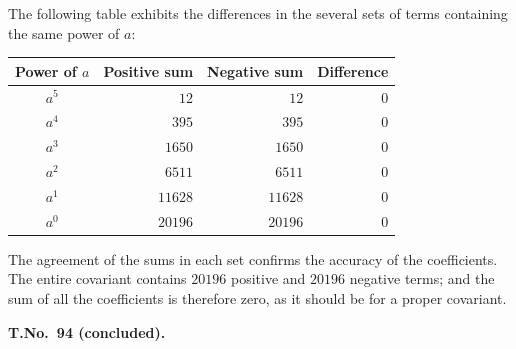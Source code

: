 \documentclass[11pt,a4paper]{article}
\begin{document}
The following table exhibits the differences in the several sets of terms containing the same power of $a$:

\begin{center}
\begin{tabular}{|c|r|r|r|}
\hline
Power of $a$ & Positive sum & Negative sum & Difference \\
\hline
$a^{5}$ & $12$ & $12$ & $0$ \\
$a^{4}$ & $395$ & $395$ & $0$ \\
$a^{3}$ & $1650$ & $1650$ & $0$ \\
$a^{2}$ & $6511$ & $6511$ & $0$ \\
$a^{1}$ & $11628$ & $11628$ & $0$ \\
$a^{0}$ & $20196$ & $20196$ & $0$ \\
\hline
\end{tabular}
\end{center}

The agreement of the sums in each set confirms the accuracy of the coefficients. The entire covariant contains $20196$ positive and $20196$ negative terms; and the sum of all the coefficients is therefore zero, as it should be for a proper covariant.

\clearpage
\setcounter{page}{298}

\begin{center}
\textbf{T.\quad No.\ 94 (concluded).}
\end{center}
\end{document}
